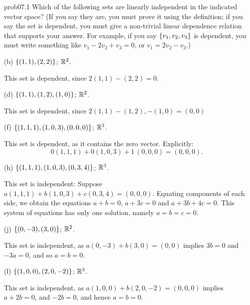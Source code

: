 
\begin{sol}{prob07.1} Which of the following sets are linearly independent in the indicated vector space? (If you say they are, you must prove it using the definition; if you say the set is dependent, you must give a non-trivial linear dependence relation that supports your answer. For example, if you say $\{v_1, v_2, v_3 \}$ is dependent, you must write something like  $v_1-2 v_2 +v_3=0$, or $v_1=2 v_2 -v_3$.)
\medskip

(b) $\{(1,1), (2, 2) \}$; $\mathbb{R}^2$.

\soln This set is dependent, since $2(1,1)-(2,2)=0$.
\medskip
%


(d) $\{(1,1), (1, 2), (1,0) \}$; $\mathbb{R}^2$.

\soln This set is dependent, since $2(1,1)- (1, 2), -(1,0)=(0,0)$
\medskip
%

(f) $\{(1,1,1), (1,0,3), (0,0,0) \}$; $\mathbb{R}^3$.

\soln This set is dependent, as it contains the zero vector. Explicitly: $$0(1,1,1)+ 0(1,0,3) +1\, (0,0,0)=(0,0,0).$$
\medskip

(h) $\{(1,1,1), (1,0,3), (0,3,4) \}$; $\mathbb{R}^3$.

\soln This set is independent: Suppose $a(1,1,1)+b(1,0,3)+c (0,3,4)=(0,0,0)$. Equating components of each side, we obtain the equations $a+b=0$, $a+3c=0$ and $a +3b+4c=0$. This system of equations has only one solution, namely $a=b=c=0$. 
\medskip 

(j) $\{(0,-3), (3, 0) \}$; $\mathbb{R}^2$.

\soln This set is independent, as $a(0,-3) + b(3, 0)=(0,0)$ implies $3b=0$ and $-3a=0$, and so $a=b=0$.
\medskip
%

(l) $\{(1,0,0), (2,0,-2) \}$; $\mathbb{R}^3$.

\soln This set is independent, as $a(1,0,0)+b (2,0,-2)=(0,0,0)$ implies $a+2b=0$,  and $-2b=0$, and hence $a=b=0$.
\medskip



\end{sol}

